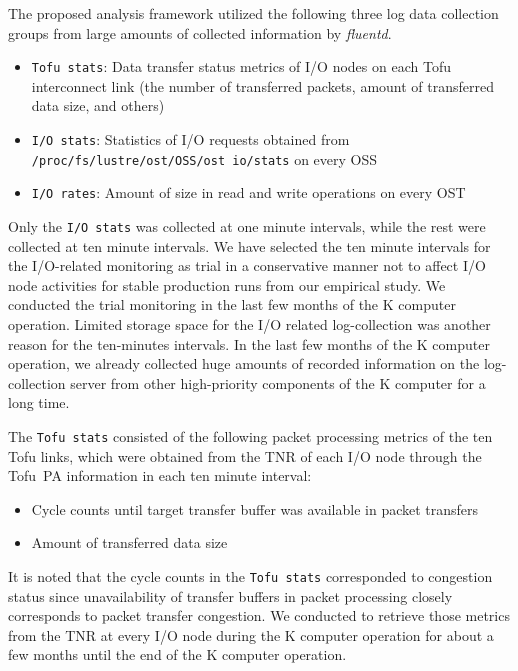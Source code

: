 \documentclass{jhps}
\begin{document}

The proposed analysis framework utilized the following three log data collection groups
from large amounts of collected information by {\itshape fluentd}.
%
\begin{itemize}
\item {\tt Tofu stats}: Data transfer status metrics of I/O nodes on each Tofu interconnect link
(the number of transferred packets, amount of transferred data size, and others)
\item {\tt I/O stats}: Statistics of I/O requests obtained from
{\tt /proc/fs/lustre/ost/OSS/ost io/stats} on every OSS
\item {\tt I/O rates}: Amount of size in read and write operations on every OST
\end{itemize}
%
Only the {\tt I/O stats} was collected at one minute intervals,
while the rest were collected at ten minute intervals.
We have selected the ten minute intervals for the I/O-related monitoring as trial
in a conservative manner not to affect I/O node activities for stable production runs
from our empirical study.
We conducted the trial monitoring in the last few months of the K computer operation.
Limited storage space for the I/O related log-collection was another reason
for the ten-minutes intervals.
In the last few months of the K computer operation,
we already collected huge amounts of recorded information
on the log-collection server from other high-priority components
of the K computer for a long time.

The {\tt Tofu stats} consisted of the following packet processing metrics
of the ten Tofu links, which were obtained from the TNR of each I/O node
through the Tofu~PA information in each ten minute interval:
%
\begin{itemize}
\item Cycle counts until target transfer buffer was available in packet transfers
\item Amount of transferred data size
\end{itemize}
%
It is noted that the cycle counts in the {\tt Tofu stats} corresponded to
congestion status since unavailability of transfer buffers in packet processing
closely corresponds to packet transfer congestion.
We conducted to retrieve those metrics from the TNR at every I/O node
during the K computer operation for about a few months
until the end of the K computer operation.
\end{document}
